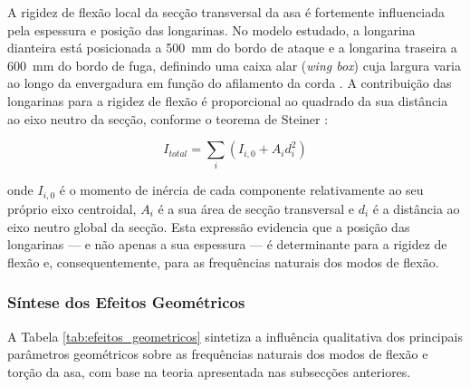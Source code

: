 \documentclass[a4paper,fleqn,noprintline]{cas-dc}
\begin{document}
A rigidez de flexão local da secção transversal da asa é fortemente influenciada pela espessura e posição das longarinas. No modelo estudado, a longarina dianteira está posicionada a \SI{500}{\milli\meter} do bordo de ataque e a longarina traseira a \SI{600}{\milli\meter} do bordo de fuga, definindo uma caixa alar (\textit{wing box}) cuja largura varia ao longo da envergadura em função do afilamento da corda \cite{Megson2012}. A contribuição das longarinas para a rigidez de flexão é proporcional ao quadrado da sua distância ao eixo neutro da secção, conforme o teorema de Steiner \cite{Rao2011}:

\begin{equation}
    I_{total} = \sum_i \left( I_{i,0} + A_i d_i^2 \right)
    \label{eq:steiner}
\end{equation}

\noindent onde $I_{i,0}$ é o momento de inércia de cada componente relativamente ao seu próprio eixo centroidal, $A_i$ é a sua área de secção transversal e $d_i$ é a distância ao eixo neutro global da secção. Esta expressão evidencia que a posição das longarinas --- e não apenas a sua espessura --- é determinante para a rigidez de flexão e, consequentemente, para as frequências naturais dos modos de flexão.

\subsubsection{Síntese dos Efeitos Geométricos}

A Tabela \ref{tab:efeitos_geometricos} sintetiza a influência qualitativa dos principais parâmetros geométricos sobre as frequências naturais dos modos de flexão e torção da asa, com base na teoria apresentada nas subsecções anteriores.
\end{document}
